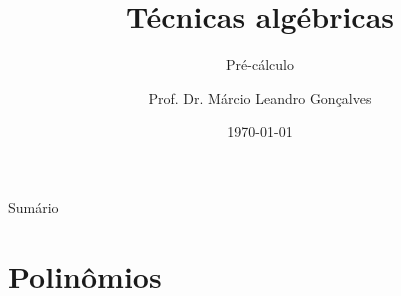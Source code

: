 \documentclass[14pt, aspectratio=169]{beamer}
\title{Técnicas algébricas}
\subtitle{Pré-cálculo}
\author{Prof. Dr. Márcio Leandro Gonçalves}
\date{\today}
\institute{PUC Minas - Poços de Caldas}
\begin{document}
\begin{frame}
\maketitle 
\end{frame}

\begin{frame}{Sumário}
    \begin{multicols}{2}
        \tableofcontents
    \end{multicols}
    
\end{frame}

\section{Polinômios}
\end{document}
